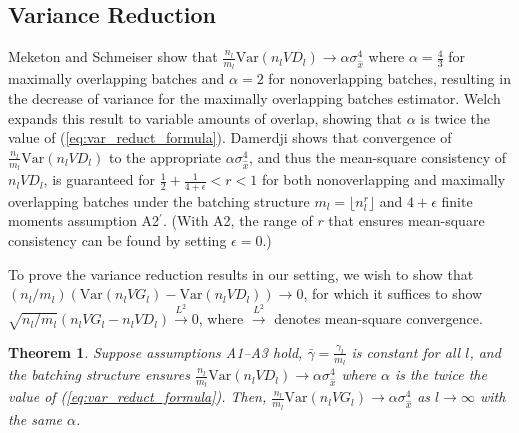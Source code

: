 \documentclass[12pt]{article}
\newtheorem{theorem}{Theorem}
\newcommand{\var}[1]{\mathrm{Var} \left( #1 \right)}
\newcommand{\x}{x}
\newcommand{\xh}{{\hat{\x}}}
\newcommand{\gammab}{\bar{\gamma}}
\begin{document}
\subsection{Variance Reduction}
\label{ssec:var_reduct}

Meketon and Schmeiser \citep{Meketon1984} show that $\frac{n_l}{m_l}\var{n_l VD_l} \rightarrow \alpha \sigma^4_{\xh}$ where $\alpha = \frac{4}{3}$ for maximally overlapping batches and $\alpha = 2$ for nonoverlapping batches, resulting in the decrease of variance for the maximally overlapping batches estimator.  
Welch \citep{Welch1987} expands this result to variable amounts of overlap, showing that $\alpha$ is twice the value of (\ref{eq:var_reduct_formula}).  
Damerdji \citep{damerdji1995mean} shows that convergence of $\frac{n_l}{m_l}\var{n_l VD_l}$ to the appropriate $\alpha \sigma^4_{\xh}$, and thus the mean-square consistency of $n_l VD_l$, is guaranteed for $\tfrac{1}{2} + \tfrac{1}{4+\epsilon} < r < 1$ for both nonoverlapping and maximally overlapping batches under the batching structure $m_l = \lfloor n_l^r \rfloor$ and $4+\epsilon$ finite moments assumption A2$^\prime$.  
(With A2, the range of $r$ that ensures mean-square consistency can be found by setting $\epsilon=0$.)

To prove the variance reduction results in our setting, we wish to show that $({n_l}/{m_l}) \left( \var{n_l VG_l} - \var{n_l VD_l} \right) \rightarrow 0$, for which it suffices to show $\sqrt{{n_l}/{m_l}} \left( n_l VG_l - n_l VD_l \right) \xrightarrow{L^2} 0$, where $\xrightarrow{L^2}$ denotes mean-square convergence.

%


\begin{theorem} \label{thm:varvar_conv}
	Suppose assumptions A1--A3 hold, $\gammab = \frac{\gamma_l}{m_l}$ is constant for all $l$, and the batching structure ensures  $\frac{n_l}{m_l}\var{n_l VD_l} \rightarrow \alpha \sigma^4_{\xh}$ where $\alpha$ is the twice the value of (\ref{eq:var_reduct_formula}). 
        Then, $\frac{n_l}{m_l}\var{n_l VG_l} \rightarrow \alpha \sigma^4_{\xh}$ as $l \rightarrow \infty$ with the same $\alpha$. 
\end{theorem}
\end{document}
